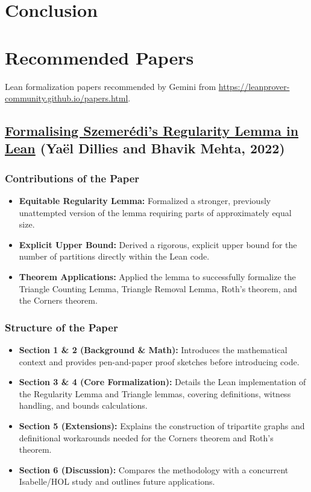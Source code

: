 \documentclass{article}
\begin{document}
\section{Conclusion}

\section{Recommended Papers}

Lean formalization papers recommended by Gemini from \url{https://leanprover-community.github.io/papers.html}.

\subsection{\href{https://drops.dagstuhl.de/storage/00lipics/lipics-vol237-itp2022/LIPIcs.ITP.2022.9/LIPIcs.ITP.2022.9.pdf}{\textbf{Formalising Szemerédi's Regularity Lemma in Lean}} (Yaël Dillies and Bhavik Mehta, 2022)}

\subsubsection{Contributions of the Paper}
\begin{itemize}
    \item \textbf{Equitable Regularity Lemma:} Formalized a stronger, previously unattempted version of the lemma requiring parts of approximately equal size.
    \item \textbf{Explicit Upper Bound:} Derived a rigorous, explicit upper bound for the number of partitions directly within the Lean code.
    \item \textbf{Theorem Applications:} Applied the lemma to successfully formalize the Triangle Counting Lemma, Triangle Removal Lemma, Roth's theorem, and the Corners theorem.
\end{itemize}

\subsubsection{Structure of the Paper}
\begin{itemize}
    \item \textbf{Section 1 \& 2 (Background \& Math):} Introduces the mathematical context and provides pen-and-paper proof sketches before introducing code.
    \item \textbf{Section 3 \& 4 (Core Formalization):} Details the Lean implementation of the Regularity Lemma and Triangle lemmas, covering definitions, witness handling, and bounds calculations.
    \item \textbf{Section 5 (Extensions):} Explains the construction of tripartite graphs and definitional workarounds needed for the Corners theorem and Roth's theorem.
    \item \textbf{Section 6 (Discussion):} Compares the methodology with a concurrent Isabelle/HOL study and outlines future applications.
\end{itemize}
\end{document}
